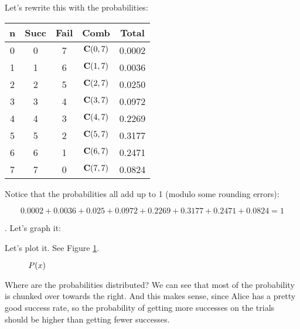 \documentclass[../../../main.tex]{subfiles}
\begin{document}
\noindent
Let's rewrite this with the probabilities:

\begin{center}
  \begin{tabular}{| c | c | c | c | c |}
    \hline
  \textbf{n} & \textbf{Succ} & \textbf{Fail} & \textbf{Comb} & \textbf{Total} \\ \hline
  0 & 0    & 7    & $\mathbf{C}(0, 7)$ & 0.0002 \\ \hline
  1 & 1    & 6    & $\mathbf{C}(1, 7)$ & 0.0036 \\ \hline
  2 & 2    & 5    & $\mathbf{C}(2, 7)$ & 0.0250 \\ \hline
  3 & 3    & 4    & $\mathbf{C}(3, 7)$ & 0.0972 \\ \hline
  4 & 4    & 3    & $\mathbf{C}(4, 7)$ & 0.2269 \\ \hline
  5 & 5    & 2    & $\mathbf{C}(5, 7)$ & 0.3177 \\ \hline
  6 & 6    & 1    & $\mathbf{C}(6, 7)$ & 0.2471 \\ \hline
  7 & 7    & 0    & $\mathbf{C}(7, 7)$ & 0.0824 \\ \hline
  \end{tabular}
\end{center}

\noindent
Notice that the probabilities all add up to 1 (modulo some rounding errors):

\begin{equation*}
    0.0002 + 0.0036 + 0.025 + 0.0972 + 0.2269 + 0.3177 + 0.2471 + 0.0824 = 1
\end{equation*}

\noindent.
Let's graph it:

\noindent
Let's plot it. See Figure \ref{plot:example-3}.

\begin{figure}[ht]
  \caption{\label{plot:example-3} $\Probability{\RandVarVal/}$}
\end{figure}

Where are the probabilities distributed? We can see that most of the probability is chunked over towards the right. And this makes sense, since Alice has a pretty good success rate, so the probability of getting more successes on the trials should be higher than getting fewer successes.
\end{document}
